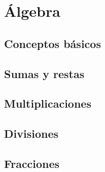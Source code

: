 \chapter{Álgebra}
\section{Conceptos básicos}
\section{Sumas y restas}
\section{Multiplicaciones}
\section{Divisiones}
\section{Fracciones}